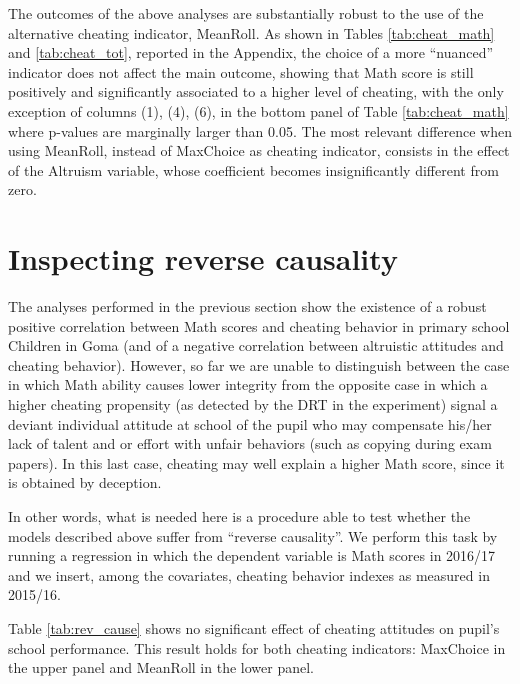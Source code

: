 \documentclass[authoryear, preprint, review, 12pt]{elsarticle}
\begin{document}


The outcomes of the above analyses are substantially robust to the use of the alternative cheating indicator, MeanRoll. As shown in Tables \ref{tab:cheat_math} and \ref{tab:cheat_tot}, reported in the Appendix, the choice of a more \enquote{nuanced} indicator does not affect the main outcome, showing that Math score is still positively and significantly associated to a higher level of cheating, with the only exception of columns (1), (4), (6), in the bottom panel of Table \ref{tab:cheat_math} where p-values are marginally larger than 0.05. The most relevant difference when using MeanRoll, instead of MaxChoice as cheating indicator, consists in the  effect of the Altruism variable, whose coefficient becomes insignificantly different from zero.

\section{Inspecting reverse causality}
\label{sec:revcause}

The analyses performed in the previous section show the existence of a robust positive correlation between Math scores and cheating behavior in primary school Children in Goma (and of a negative correlation between altruistic attitudes and cheating behavior).  
However, so far we are unable to distinguish between the case in which Math ability causes lower integrity from the opposite case in which a higher cheating propensity (as detected by the DRT in the experiment) signal a deviant individual attitude at school of the pupil who may compensate his/her lack of talent and or effort with unfair behaviors (such as copying during exam papers). In this last case, cheating may well explain a higher Math score, since it is obtained by deception.

In other words, what is needed here is a procedure able to test whether the models described above suffer from \enquote{reverse causality}. We perform this task by running a regression in which the dependent variable is Math scores in 2016/17 and we insert, among the covariates, cheating behavior indexes as measured in 2015/16.

Table \ref{tab:rev_cause} shows no significant effect of cheating attitudes on pupil's school performance. This result holds for both cheating indicators: MaxChoice in the upper panel and MeanRoll in the lower panel. 


\end{document}
